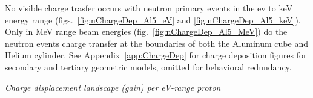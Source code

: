 \documentclass[11pt]{article}
\makeatletter
\newenvironment{figurehere}
{\def\@captype{figure}}{}
\makeatother
\begin{document}
\begin{multicols}{2}
No visible charge trasfer occurs with neutron primary events in the ev to keV energy range (figs.~\ref{fig:nChargeDep_Al5_eV} and \ref{fig:nChargeDep_Al5_keV}).  Only in MeV range beam energies (fig.~\ref{fig:nChargeDep_Al5_MeV}) do the neutron events charge transfer at the boundaries of both the Aluminum cube and Helium cylinder. See Appendix~\ref{app:ChargeDep} for charge deposition figures for secondary and tertiary geometric models, omitted for behavioral redundancy.


\vspace{0.15 cm}
\begin{figurehere}
\centering
{}
\caption{\small \emph{Charge displacement landscape (gain) per eV-range proton}}
\label{fig:pChargeDep_Al5_eV}
\end{figurehere}
\vspace{0.15 cm}
\begin{figurehere}
\centering
{}

\end{figurehere}
\end{multicols}
\end{document}
